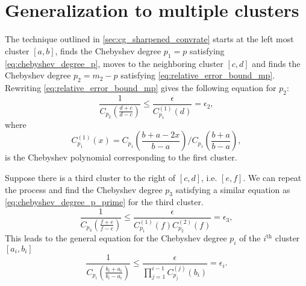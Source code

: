 \section{Generalization to multiple clusters}\label{sec:multiple_clusters}
The technique outlined in \cref{sec:cg_sharpened_convrate} starts at the left most cluster $[a,b]$, finds the Chebyshev degree $p_1=p$ satisfying \cref{eq:chebyshev_degree_p}, moves to the neighboring cluster $[c,d]$ and finds the Chebyshev degree $p_2 = m_2 - p$ satisfying \cref{eq:relative_error_bound_mp}. Rewriting \cref{eq:relative_error_bound_mp} gives the following equation for $p_2$:
\begin{equation}
    \frac{1}{C_{p_2}\left(\frac{d+c}{d-c}\right)} \leq \frac{\epsilon}{{C}^{(1)}_{p_1}(d)} = \epsilon_2,
    \label{eq:chebyshev_degree_p_prime}
\end{equation}
where
\[
    C^{(1)}_{p_1}(x) = C_{p_1}\left(\frac{b + a - 2x}{b - a}\right) /C_{p_1}\left(\frac{b+a}{b-a}\right),
\]
is the Chebyshev polynomial corresponding to the first cluster.

Suppose there is a third cluster to the right of $[c,d]$, i.e. $[e,f]$. We can repeat the process and find the Chebyshev degree $p_3$ satisfying a similar equation as \cref{eq:chebyshev_degree_p_prime} for the third cluster. 
\[
    \frac{1}{C_{p_3}\left(\frac{f+e}{f-e}\right)} \leq \frac{\epsilon}{C^{(1)}_{p_1}(f)C^{(2)}_{p_2}(f)} = \epsilon_3,
\]
This leads to the general equation for the Chebyshev degree $p_i$ of the $i^{\text{th}}$ cluster $[a_i, b_i]$
\begin{equation}
    \frac{1}{C_{p_i}\left(\frac{b_i + a_i}{b_i - a_i}\right)} \leq \frac{\epsilon}{\prod_{j=1}^{i-1} C^{(j)}_{p_j}(b_i)} = \epsilon_i.
    \label{eq:chebyshev_degree_p_i}
\end{equation}

